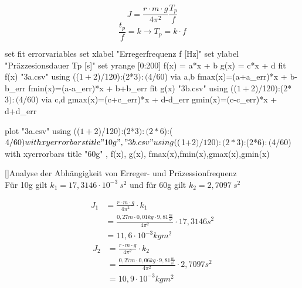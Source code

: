 \documentclass[12pt,a4paper,]{scrreprt}
\begin{document}
    \begin{equation}
    	J = \frac{r\cdot m \cdot g}{4\pi^2} \frac{T_p}{f}
        \label{Formelfuerk1_1}
    \end{equation}
    \begin{equation}
    	\frac{t_p}{f} = k \longrightarrow T_p = k \cdot f 
        \label{Formelfuerk1_2}
    \end{equation}
    \begin{gnuplot}[terminal=pdf,terminaloptions={font ",10" linewidth 3},scale=1.2]
    		set  fit errorvariables
        	set xlabel "Erregerfrequenz f [Hz]"
            set ylabel "Präzzesionsdauer Tp [s]"
			set yrange [0:200]
            f(x) = a*x + b
            g(x) = c*x + d
            fit  f(x) "3a.csv" using (($1+$2)/120):(2*$3):($4/60)  via a,b
            fmax(x)=(a+a_err)*x + b-b_err
            fmin(x)=(a-a_err)*x + b+b_err
            fit  g(x) "3b.csv" using (($1+$2)/120):(2*$3):($4/60)  via c,d
            gmax(x)=(c+c_err)*x + d-d_err
            gmin(x)=(c-c_err)*x + d+d_err
            
        
 
			plot "3a.csv" using (($1+$2)/120):(2*$3):(2*$6):($4/60) with xyerrorbars title "10g", "3b.csv" using (($1+$2)/120):(2*$3):(2*$6):($4/60) with xyerrorbars title "60g" , f(x), g(x), fmax(x),fmin(x),gmax(x),gmin(x)
		\end{gnuplot}
        []{Analyse der Abhängigkeit von Erreger- und Präzessionfrequenz}
        \ \\
        Für 10g gilt $k_1 = 17,3146 \cdot 10^{-3} ~ s^2$ und für 60g gilt $k_2 = 2,7097 ~ s^2$

    
    \begin{align*}
    	J_1 & = \frac{r\cdot m \cdot g}{4\pi^2} \cdot k_1 \\
        	& = \frac{0,27 m \cdot 0,01kg \cdot 9,81 \frac{m}{s^2}}{4\pi^2} \cdot 17,3146 s^2 \\
            & = 11,6 \cdot 10^{-3} kgm^2
    \end{align*}
    \begin{align*}
    	J_2 & = \frac{r\cdot m \cdot g}{4\pi^2} \cdot k_2 \\
        	& = \frac{0,27 m \cdot 0,06kg \cdot 9,81 \frac{m}{s^2}}{4\pi^2} \cdot 2,7097 s^2 \\
            & = 10,9 \cdot 10^{-3}kgm^2
    \end{align*}
    \pagebreak
\end{document}
